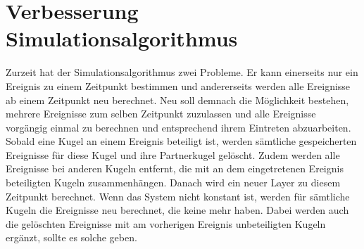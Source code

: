 \section{Verbesserung Simulationsalgorithmus}\label{anhang:simulation:algorithmus}
Zurzeit hat der Simulationsalgorithmus zwei Probleme. Er kann einerseits nur ein Ereignis zu einem Zeitpunkt bestimmen und
andererseits werden alle Ereignisse ab einem Zeitpunkt neu berechnet. Neu soll demnach die Möglichkeit bestehen, mehrere
Ereignisse zum selben Zeitpunkt zuzulassen und alle Ereignisse vorgängig einmal zu berechnen und entsprechend ihrem Eintreten
abzuarbeiten. Sobald eine Kugel an einem Ereignis beteiligt ist, werden sämtliche gespeicherten Ereignisse für diese Kugel und
ihre Partnerkugel gelöscht. Zudem werden alle Ereignisse bei anderen Kugeln entfernt, die mit an dem eingetretenen Ereignis beteiligten Kugeln
zusammenhängen. Danach wird ein neuer Layer zu diesem Zeitpunkt berechnet. Wenn das System nicht konstant ist, werden
für sämtliche Kugeln die Ereignisse neu berechnet, die keine mehr haben. Dabei werden auch die gelöschten Ereignisse
mit am vorherigen Ereignis unbeteiligten Kugeln ergänzt, sollte es solche geben.

